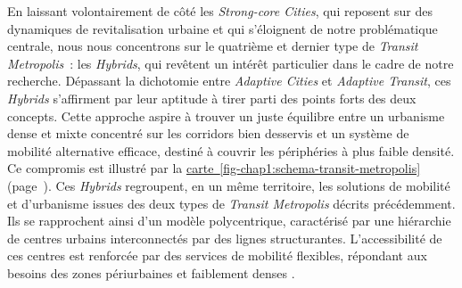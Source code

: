 \begin{refsegment}
En laissant volontairement de côté les \textsl{Strong-core Cities}, qui reposent sur des dynamiques de revitalisation urbaine et qui s’éloignent de notre problématique centrale, nous nous concentrons sur le quatrième et dernier type de \textsl{Transit Metropolis}~: les \textsl{Hybrids}, qui revêtent un intérêt particulier dans le cadre de notre recherche. Dépassant la dichotomie entre \textsl{Adaptive Cities} et \textsl{Adaptive Transit}, ces \textsl{Hybrids} s’affirment par leur aptitude à tirer parti des points forts des deux concepts. Cette approche aspire à trouver un juste équilibre entre un urbanisme dense et mixte concentré sur les corridors bien desservis et un système de mobilité alternative efficace, destiné à couvrir les périphéries à plus faible densité. Ce compromis est illustré par la \hyperref[fig-chap1:schema-transit-metropolis]{carte~\ref{fig-chap1:schema-transit-metropolis}} (page~\pageref{fig-chap1:schema-transit-metropolis}). Ces \textsl{Hybrids} regroupent, en un même territoire, les solutions de mobilité et d’urbanisme issues des deux types de \textsl{Transit Metropolis} décrits précédemment. Ils se rapprochent ainsi d’un modèle polycentrique, caractérisé par une hiérarchie de centres urbains interconnectés par des lignes structurantes. L’accessibilité de ces centres est renforcée par des services de mobilité flexibles, répondant aux besoins des zones périurbaines et faiblement denses \textcolor{blue}{\autocite[213-295]{cervero_transit_1998}}.%
    

\end{refsegment}
